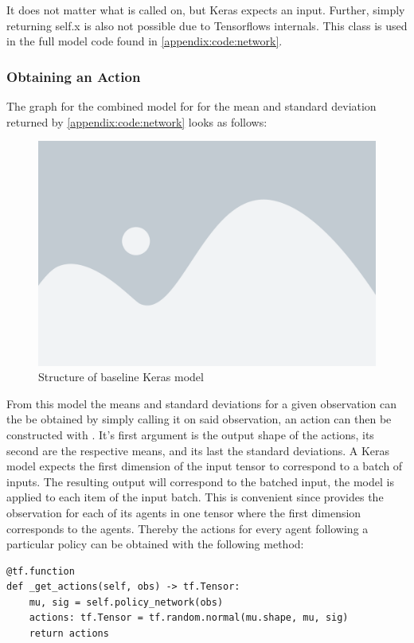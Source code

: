 \noindent
It does not matter what  is called on, but Keras expects an input. Further, simply returning self.x is also not possible due to Tensorflows internals. This class is used in the full model code found in \ref{appendix:code:network}.
\subsubsection{Obtaining an Action}
The graph for the combined model for for the mean and standard deviation returned by \ref{appendix:code:network} looks as follows:

\begin{figure}[H]
    \centering
    \includegraphics[width=0.5\linewidth]{figures/placeholder.png}
    \caption{Structure of baseline Keras model}
    \label{fig:full_model_graph}
\end{figure}

\noindent
From this model the means and standard deviations for a given observation can the be obtained by simply calling it on said observation, an action can then be constructed with . It's first argument is the output shape of the actions, its second are the respective means, and its last the standard deviations. A Keras model expects the first dimension of the input tensor to correspond to a batch of inputs. The resulting output will correspond to the batched input, the model is applied to each item of the input batch. This is convenient since  provides the observation for each of its agents in one tensor where the first dimension corresponds to the agents. Thereby the actions for every agent following a particular policy can be obtained with the following method:

\begin{lstlisting}[basicstyle=\footnotesize]
@tf.function
def _get_actions(self, obs) -> tf.Tensor:
    mu, sig = self.policy_network(obs)
    actions: tf.Tensor = tf.random.normal(mu.shape, mu, sig)
    return actions
\end{lstlisting}

